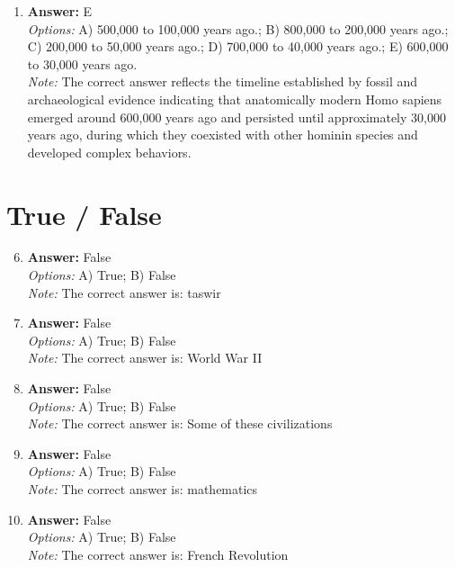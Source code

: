 \documentclass[12pt]{article}
\begin{document}
\begin{enumerate}[label=\arabic*.]
\\ \textit{Note:} Aurignacian technology is characterized by its advanced blade production techniques that resulted in longer, more efficient blades with greater usable surface area compared to the predominantly flake-based Mousterian technology.
\item \textbf{Answer:} E
\\ \textit{Options:} A) 500,000 to 100,000 years ago.; B) 800,000 to 200,000 years ago.; C) 200,000 to 50,000 years ago.; D) 700,000 to 40,000 years ago.; E) 600,000 to 30,000 years ago.
\\ \textit{Note:} The correct answer reflects the timeline established by fossil and archaeological evidence indicating that anatomically modern Homo sapiens emerged around 600,000 years ago and persisted until approximately 30,000 years ago, during which they coexisted with other hominin species and developed complex behaviors.
\end{enumerate}

\section*{True / False}
\begin{enumerate}[label=\arabic*.]
\setcounter{enumi}{5}
\item \textbf{Answer:} False
\\ \textit{Options:} A) True; B) False
\\ \textit{Note:} The correct answer is: taswir
\item \textbf{Answer:} False
\\ \textit{Options:} A) True; B) False
\\ \textit{Note:} The correct answer is: World War II
\item \textbf{Answer:} False
\\ \textit{Options:} A) True; B) False
\\ \textit{Note:} The correct answer is: Some of these civilizations
\item \textbf{Answer:} False
\\ \textit{Options:} A) True; B) False
\\ \textit{Note:} The correct answer is: mathematics
\item \textbf{Answer:} False
\\ \textit{Options:} A) True; B) False
\\ \textit{Note:} The correct answer is: French Revolution
\end{enumerate}
\end{document}
